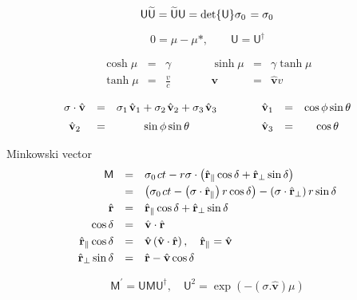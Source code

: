 \documentclass[aps,twocolumn,secnumarabic,nobalancelastpage,amsmath,amssymb,
amsthm,nofootinbib,parskip=full]{revtex4}
\numberwithin{equation}{section}
\newcommand{\adjoint}[1]{\widetilde{#1}}
\newcommand{\uvector}[1]{\hat{\mathbf{#1}}}
\newcommand{\pauli}[1]{\sigma_#1\mkern2mu}
\newcommand{\qv}[1]{\mathbf{\mathsf{#1}}}
\begin{document}
\begin{equation*}
\qv{U}\adjoint{\qv{U}}=
\adjoint{\qv{U}}\qv{U}=\det{\qv{U}}\pauli{0}=\pauli{0}
\end{equation*}

\begin{equation*}
0=\mu-\mu*,\qquad\qv{U}=\qv{U}^\dagger
\end{equation*}

\begin{equation*}
\begin{array}{ccccccc}
\cosh\mu&=&\gamma&\qquad&\sinh\mu&=&\gamma\tanh\mu \\[9pt]
\tanh\mu&=&\frac{v}{c}&\qquad&\mathbf{v}&=&\uvector{v}v
\end{array}
\end{equation*}

\begin{equation*}
\begin{array}{ccccccc}
\sigma\cdot\uvector{v}&=&
\pauli{1}\uvector{v}_1+\pauli{2}\uvector{v}_2+\pauli{3}\uvector{v}_3&\qquad&
\uvector{v}_1&=&\cos\phi\sin\theta \\[5pt]
\uvector{v}_2&=&\sin\phi\sin\theta&\qquad&
\uvector{v}_3&=&\cos\theta
\end{array}
\end{equation*}

Minkowski vector
\begin{equation*}
\begin{array}{rcl}
\qv{M}&=&\pauli{0}ct-
r\sigma\cdot\left(\uvector{r}_\parallel\cos\delta+
  \uvector{r}_\perp\sin\delta\right) \\[3pt]
&=&\left(\pauli{0}ct-
\left(\sigma\cdot\uvector{r}_\parallel\right)r\cos\delta\right)-
  \left(\sigma\cdot\uvector{r}_\perp\right)r\sin\delta \\[3pt]
\uvector{r}&=&\uvector{r}_\parallel\cos\delta+\uvector{r}_\perp\sin\delta \\[3pt]
\cos\delta&=&\uvector{v}\cdot\uvector{r} \\[3pt]
\uvector{r}_\parallel\cos\delta&=&
             \uvector{v}\left(\uvector{v}\cdot\uvector{r}\right),\quad
                                   \uvector{r}_\parallel=\uvector{v} \\[3pt]
\uvector{r}_\perp\sin\delta&=&\uvector{r}-\uvector{v}\cos\delta
\end{array}
\end{equation*}

\begin{equation*}
\qv{M}^\prime=\qv{U}\qv{M}\qv{U}^\dagger,
\quad\qv{U}^2=\exp\left(-\left(\sigma.\uvector{v}\right)\mu\right)
\end{equation*}
\end{document}
